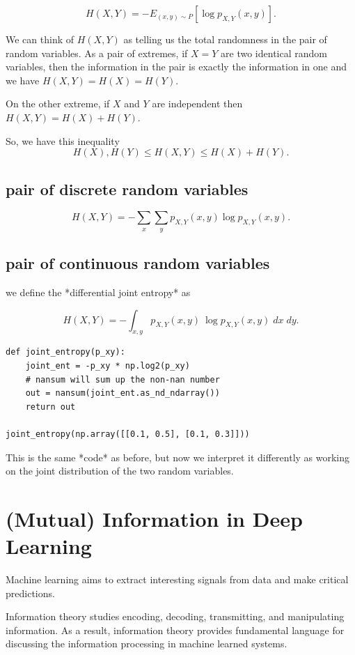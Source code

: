 $$H(X, Y) = -E_{(x, y) \sim P} [\log p_{X, Y}(x, y)]. $$

We can think of $H(X,Y)$ as telling us the total randomness in the pair of
random variables.  As a pair of extremes, if $X = Y$ are two identical random
variables, then the information in the pair is exactly the information in one
and we have $H(X, Y) = H(X) = H(Y)$.

On the other extreme, if $X$ and $Y$ are independent then $H(X, Y) = H(X) + H(Y)$.  

So, we have this inequality
$$
H(X), H(Y) \le H(X, Y) \le H(X) + H(Y).
$$

\subsection{pair of discrete random variables}


$$H(X, Y) = - \sum_{x} \sum_{y} p_{X, Y}(x, y) \log p_{X, Y}(x, y).$$

\subsection{pair of continuous random variables}

we define the *differential joint entropy* as 

$$H(X, Y) = - \int_{x, y} p_{X, Y}(x, y) \ \log p_{X, Y}(x, y) \;dx \;dy.$$



\begin{lstlisting}
def joint_entropy(p_xy):
    joint_ent = -p_xy * np.log2(p_xy)
    # nansum will sum up the non-nan number
    out = nansum(joint_ent.as_nd_ndarray())
    return out

joint_entropy(np.array([[0.1, 0.5], [0.1, 0.3]]))
\end{lstlisting}
This is the same *code* as before, but now we interpret it differently as working on the joint distribution of the two random variables.




\section{(Mutual) Information in Deep Learning}

Machine learning aims to extract interesting signals from data and make critical
predictions.

Information theory studies encoding, decoding, transmitting, and manipulating
information. As a result, information theory provides fundamental language for
discussing the information processing in machine learned systems.

